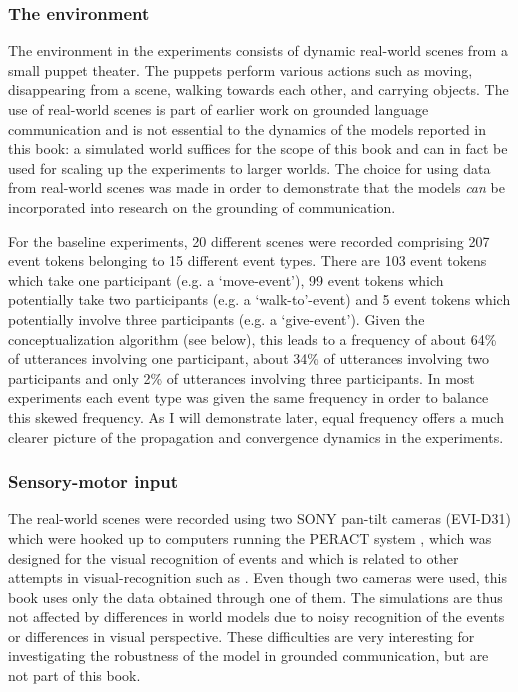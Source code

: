 \subsubsection{The environment}
 The environment in the experiments consists of dynamic real-world scenes from a small puppet theater. The puppets perform various actions such as moving, disappearing from a scene, walking towards each other, and carrying objects. The use of real-world scenes is part of earlier work on grounded language communication \citep{steels02simulating, steels03shared} and is not essential to the dynamics of the models reported in this book: a simulated world suffices for the scope of this book and can in fact be used for scaling up the experiments to larger worlds. The choice for using data from real-world scenes was made in order to demonstrate that the models {\em can} be incorporated into research on the grounding of communication.

For the baseline experiments, 20 different scenes were recorded comprising 207 event tokens belonging to 15 different event types. There are 103 event tokens which take one participant (e.g. a `move-event'), 99 event tokens which potentially take two participants (e.g. a `walk-to'-event) and 5 event tokens which potentially involve three participants (e.g. a `give-event'). Given the conceptualization algorithm (see below), this leads to a frequency of about 64\% of utterances involving one participant, about 34\% of utterances involving two participants and only 2\% of utterances involving three participants. In most experiments each event type was given the same frequency in order to balance this skewed frequency. As I will demonstrate later, equal frequency offers a much clearer picture of the propagation and convergence dynamics in the experiments.


\subsubsection{Sensory-motor input}
 The real-world scenes were recorded using two SONY pan-tilt cameras (EVI-D31) which were hooked up to computers running the PERACT system \citep{baillie00action, steels03shared}, which was designed for the visual recognition of events and which is related to other attempts in visual-recognition such as \citet{siskind00visual}. Even though two cameras were used, this book uses only the data obtained through one of them. The simulations are thus not affected by differences in world models due to noisy recognition of the events or differences in visual perspective. These difficulties are very interesting for investigating the robustness of the model in grounded communication, but are not part of this book.

